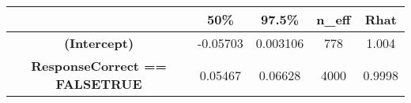 \documentclass[]{article}
\begin{document}
\begin{longtable}[]{@{}ccccc@{}}
\toprule
\begin{minipage}[b]{0.38\columnwidth}\centering\strut
~\strut
\end{minipage} & \begin{minipage}[b]{0.13\columnwidth}\centering\strut
50\%\strut
\end{minipage} & \begin{minipage}[b]{0.13\columnwidth}\centering\strut
97.5\%\strut
\end{minipage} & \begin{minipage}[b]{0.10\columnwidth}\centering\strut
n\_eff\strut
\end{minipage} & \begin{minipage}[b]{0.10\columnwidth}\centering\strut
Rhat\strut
\end{minipage}\tabularnewline
\midrule
\endhead
\begin{minipage}[t]{0.38\columnwidth}\centering\strut
\textbf{(Intercept)}\strut
\end{minipage} & \begin{minipage}[t]{0.13\columnwidth}\centering\strut
-0.05703\strut
\end{minipage} & \begin{minipage}[t]{0.13\columnwidth}\centering\strut
0.003106\strut
\end{minipage} & \begin{minipage}[t]{0.10\columnwidth}\centering\strut
778\strut
\end{minipage} & \begin{minipage}[t]{0.10\columnwidth}\centering\strut
1.004\strut
\end{minipage}\tabularnewline
\begin{minipage}[t]{0.38\columnwidth}\centering\strut
\textbf{ResponseCorrect == FALSETRUE}\strut
\end{minipage} & \begin{minipage}[t]{0.13\columnwidth}\centering\strut
0.05467\strut
\end{minipage} & \begin{minipage}[t]{0.13\columnwidth}\centering\strut
0.06628\strut
\end{minipage} & \begin{minipage}[t]{0.10\columnwidth}\centering\strut
4000\strut
\end{minipage} & \begin{minipage}[t]{0.10\columnwidth}\centering\strut
0.9998\strut
\end{minipage}\tabularnewline

\end{longtable}
\end{document}
